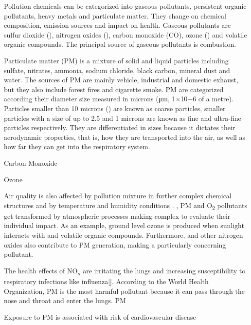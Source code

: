 Pollution chemicals can be categorized into gaseous pollutants, persistent organic pollutants, heavy metals and particulate matter. They change on chemical composition, emission sources and impact on health. Gaseous pollutants are sulfur dioxide (\SOTWO), nitrogen oxides (\NOX), carbon monoxide (CO), ozone (\OTHREE) and volatile organic compounds. The principal source of gaseous pollutants is combustion. 

Particulate matter (PM) is a mixture of solid and liquid particles including sulfate, nitrates, ammonia, sodium chloride, black carbon, mineral dust and water. The sources of PM are mainly vehicle, industrial and domestic exhaust, but they also include forest fires and cigarette smoke. PM are categorized according their diameter size measured in microns (μm, 1×10−6 of a metre). Particles smaller than 10 microns (\PMTEN) are known as coarse particles, smaller particles with a size of up to 2.5  and 1 microns are known as fine and ultra-fine particles respectively. They are differentiated in sizes because it dictates their aerodynamic properties, that is, how they are transported into the air, as well as how far they can get into the respiratory system.

Carbon Monoxide

Ozone 

Air quality is also affected by pollution mixture in further complex chemical structures and by temperature and humidity conditions . \NOTWO, PM and O\textsubscript{2}  pollutants get transformed by atmospheric processes making complex to evaluate their individual impact. As an example, ground level ozone is produced when sunlight interacts with \NOTWO and volatile organic compounds. Furthermore, \NOTWO and other nitrogen oxides also contribute to PM generation, making \NOX a particularly concerning pollutant.

 The health effects of NO\textsubscript{x} are irritating the lungs and increasing susceptibility to respiratory infections like influenza[].
 According to the World Health Organization, PM is the most harmful pollutant because it can pass through the nose and throat and enter the lungs. PM 
 
Exposure to PM is associated with risk of cardiovascular disease \cite{Polichetti2009}

